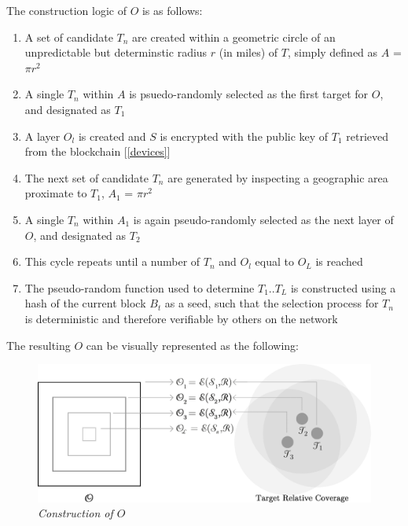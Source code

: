 \documentclass[letterpaper,11pt]{article}
\begin{document}
The construction logic of $\mathit{O}$ is as follows:

\begin{enumerate}
  \item A set of candidate $\mathit{T_n}$ are created within a geometric circle of an unpredictable but determinstic radius $\mathit{r}$ (in miles) of $\mathit{T}$, simply defined as $\mathit{A}$ = $\mathit{\pi}$$\mathit{r^2}$
  \item A single $\mathit{T_n}$ within $\mathit{A}$ is psuedo-randomly selected as the first target for $\mathit{O}$, and designated as $\mathit{T_1}$
  \item A layer $\mathit{O_l}$ is created and $\mathit{S}$ is encrypted with the public key of $\mathit{T_1}$ retrieved from the blockchain [\ref{devices}]
  \item The next set of candidate $\mathit{T_n}$ are generated by inspecting a geographic area proximate to $\mathit{T_1}$, $\mathit{A_1}$ = $\mathit{\pi}$$\mathit{r^2}$
  \item A single $\mathit{T_n}$ within $\mathit{A_1}$ is again pseudo-randomly selected as the next layer of $\mathit{O}$, and designated as $\mathit{T_2}$
  \item This cycle repeats until a number of $\mathit{T_n}$ and $\mathit{O_l}$ equal to $\mathit{O_L}$ is reached
  \item The pseudo-random function used to determine $\mathit{T_1}$..$\mathit{T_L}$ is constructed using a hash of the current block $\mathit{B_t}$ as a seed, such that the selection process for $\mathit{T_n}$ is deterministic and therefore verifiable by others on the network
\end{enumerate}

The resulting $\mathit{O}$ can be visually represented as the following:\newline

\begin{figure}[H]
	\begin{center}
  		\includegraphics[width=\textwidth]{diagram3.eps}
  		\caption{\emph{Construction of $\mathit{O}$}}
  		\label{fig:onion-packet}
 	\end{center}
\end{figure}
\end{document}
